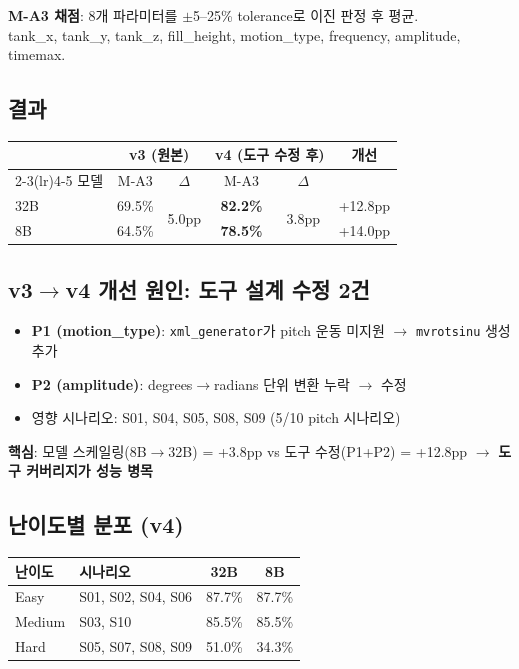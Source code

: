 \documentclass[10pt,a4paper]{article}
\begin{document}
\textbf{M-A3 채점}: 8개 파라미터를 $\pm$5--25\% tolerance로 이진 판정 후 평균.\\
tank\_x, tank\_y, tank\_z, fill\_height, motion\_type, frequency, amplitude, timemax.

\subsection{결과}

\begin{center}
\renewcommand{\arraystretch}{1.2}
\begin{tabular}{lccccc}
\toprule
& \multicolumn{2}{c}{\textbf{v3 (원본)}} & \multicolumn{2}{c}{\textbf{v4 (도구 수정 후)}} & \textbf{개선} \\
\cmidrule(lr){2-3}\cmidrule(lr){4-5}
모델 & M-A3 & $\Delta$ & M-A3 & $\Delta$ & \\
\midrule
32B & 69.5\% & \multirow{2}{*}{5.0pp} & \textbf{82.2\%} & \multirow{2}{*}{3.8pp} & +12.8pp \\
8B & 64.5\% & & \textbf{78.5\%} & & +14.0pp \\
\bottomrule
\end{tabular}
\end{center}

\subsection{v3$\rightarrow$v4 개선 원인: 도구 설계 수정 2건}

\begin{itemize}[nosep,leftmargin=1.5em]
\item \textbf{P1 (motion\_type)}: \texttt{xml\_generator}가 pitch 운동 미지원 $\rightarrow$ \texttt{mvrotsinu} 생성 추가
\item \textbf{P2 (amplitude)}: degrees$\rightarrow$radians 단위 변환 누락 $\rightarrow$ 수정
\item 영향 시나리오: S01, S04, S05, S08, S09 (5/10 pitch 시나리오)
\end{itemize}

\textbf{핵심}: 모델 스케일링(8B$\rightarrow$32B) = +3.8pp vs 도구 수정(P1+P2) = +12.8pp $\rightarrow$ \textbf{도구 커버리지가 성능 병목}

\subsection{난이도별 분포 (v4)}

\begin{center}
\renewcommand{\arraystretch}{1.1}
\begin{tabular}{llcc}
\toprule
난이도 & 시나리오 & 32B & 8B \\
\midrule
Easy & S01, S02, S04, S06 & 87.7\% & 87.7\% \\
Medium & S03, S10 & 85.5\% & 85.5\% \\
Hard & S05, S07, S08, S09 & 51.0\% & 34.3\% \\
\bottomrule
\end{tabular}
\end{center}
\end{document}
